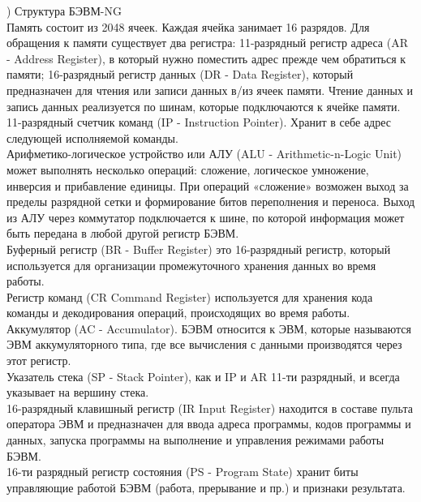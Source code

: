 ) Структура БЭВМ-NG \\
Память состоит из 2048 ячеек. Каждая ячейка занимает 16 разрядов. Для обращения к памяти существует два регистра: 11-разрядный регистр адреса (AR - Address Register), в который нужно поместить адрес прежде чем обратиться к памяти; 16-разрядный регистр данных (DR - Data Register), который предназначен для чтения или записи данных в/из ячеек памяти. Чтение данных и запись данных реализуется по шинам, которые подключаются к ячейке памяти. \\
11-разрядный счетчик команд (IP - Instruction Pointer). Хранит в себе адрес следующей исполняемой команды. \\
Арифметико-логическое устройство или АЛУ (ALU - Arithmetic-n-Logic Unit) может выполнять несколько операций: сложение, логическое умножение, инверсия и прибавление единицы. При операций «сложение» возможен выход за пределы разрядной сетки и формирование битов переполнения и переноса. Выход из АЛУ через коммутатор подключается к шине, по которой информация может быть передана в любой другой регистр БЭВМ. \\
Буферный регистр (BR - Buffer Register) это 16-разрядный регистр, который используется для организации промежуточного хранения данных во время работы. \\
Регистр команд (CR Command Register) используется для хранения кода команды и декодирования операций, происходящих во время работы. \\
Аккумулятор (AC - Accumulator). БЭВМ относится к ЭВМ, которые называются ЭВМ аккумуляторного типа, где все вычисления с данными производятся через этот регистр. \\
Указатель стека (SP - Stack Pointer), как и IP и AR 11-ти разрядный, и всегда указывает на вершину стека. \\
16-разрядный клавишный регистр (IR Input Register) находится в составе пульта оператора ЭВМ и предназначен для ввода адреса программы, кодов программы и данных, запуска программы на выполнение и управления режимами работы БЭВМ. \\
16-ти разрядный регистр состояния (PS - Program State) хранит биты управляющие работой БЭВМ (работа, прерывание и пр.) и признаки результата. \\

